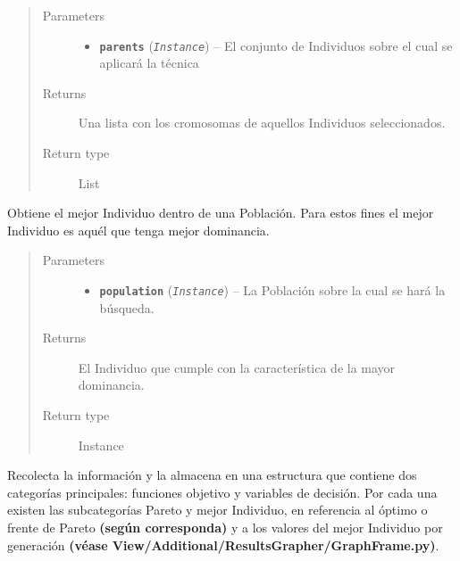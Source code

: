 \documentclass[class=report, crop=false]{standalone}
\begin{document}
\begin{fulllineitems}
\begin{fulllineitems}
\begin{quote}\begin{description}
\item[{Parameters}] \leavevmode\begin{itemize}
\item \textbf{\texttt{parents}} (\emph{\texttt{Instance}}) -- El conjunto de Individuos sobre el cual se aplicará la técnica
\end{itemize}
\item[{Returns}] \leavevmode
Una lista con los cromosomas de aquellos Individuos seleccionados.
\item[{Return type}] \leavevmode
List
\end{description}\end{quote}

\end{fulllineitems}

\begin{fulllineitems}

Obtiene el mejor Individuo dentro de una Población. 
Para estos fines el mejor Individuo es aquél que tenga 
mejor dominancia.

\begin{quote}\begin{description}
\item[{Parameters}] \leavevmode\begin{itemize}
\item \textbf{\texttt{population}} (\emph{\texttt{Instance}}) -- La Población sobre la cual se hará la búsqueda.
\end{itemize}
\item[{Returns}] \leavevmode
El Individuo que cumple con la característica de la mayor dominancia.
\item[{Return type}] \leavevmode
Instance
\end{description}\end{quote}

\end{fulllineitems}

\begin{fulllineitems}

Recolecta la información y la almacena en una estructura 
que contiene dos categorías principales: funciones objetivo 
y variables de decisión. Por cada una existen las subcategorías 
Pareto y mejor Individuo, en referencia al óptimo o frente de 
Pareto \textbf{(según corresponda)} y a los valores del mejor 
Individuo por generación \textbf{(véase View/Additional/ResultsGrapher/GraphFrame.py)}.


\end{fulllineitems}
\end{fulllineitems}
\end{document}

